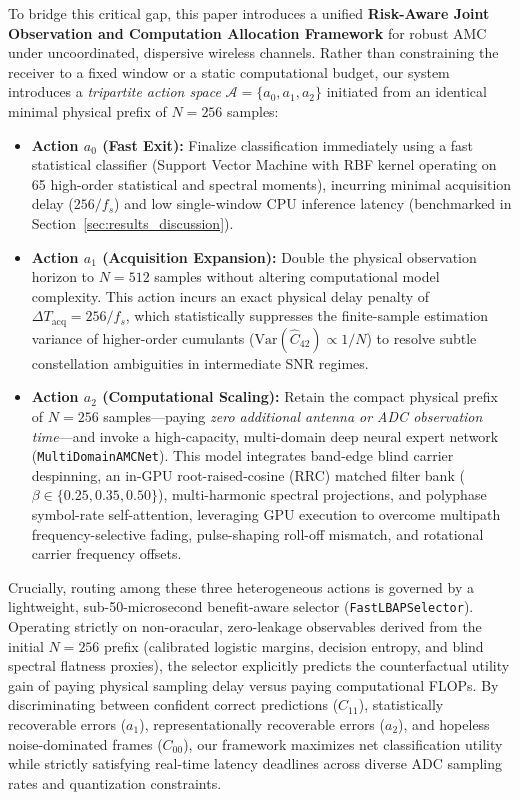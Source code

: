 To bridge this critical gap, this paper introduces a unified \textbf{Risk-Aware Joint Observation and Computation Allocation Framework} for robust AMC under uncoordinated, dispersive wireless channels. Rather than constraining the receiver to a fixed window or a static computational budget, our system introduces a \emph{tripartite action space} $\mathcal{A} = \{a_0, a_1, a_2\}$ initiated from an identical minimal physical prefix of $N=256$ samples:
\begin{itemize}
    \item \textbf{Action $a_0$ (Fast Exit):} Finalize classification immediately using a fast statistical classifier (Support Vector Machine with RBF kernel operating on 65 high-order statistical and spectral moments), incurring minimal acquisition delay ($256/f_s$) and low single-window CPU inference latency (benchmarked in Section~\ref{sec:results_discussion}).
    \item \textbf{Action $a_1$ (Acquisition Expansion):} Double the physical observation horizon to $N=512$ samples without altering computational model complexity. This action incurs an exact physical delay penalty of $\Delta T_{\text{acq}} = 256/f_s$, which statistically suppresses the finite-sample estimation variance of higher-order cumulants ($\mathrm{Var}(\hat{C}_{42}) \propto 1/N$) to resolve subtle constellation ambiguities in intermediate SNR regimes.
    \item \textbf{Action $a_2$ (Computational Scaling):} Retain the compact physical prefix of $N=256$ samples—paying \emph{zero additional antenna or ADC observation time}—and invoke a high-capacity, multi-domain deep neural expert network (\texttt{MultiDomainAMCNet}). This model integrates band-edge blind carrier despinning, an in-GPU root-raised-cosine (RRC) matched filter bank ($\beta \in \{0.25, 0.35, 0.50\}$), multi-harmonic spectral projections, and polyphase symbol-rate self-attention, leveraging GPU execution to overcome multipath frequency-selective fading, pulse-shaping roll-off mismatch, and rotational carrier frequency offsets.
\end{itemize}

Crucially, routing among these three heterogeneous actions is governed by a lightweight, sub-50-microsecond benefit-aware selector (\texttt{FastLBAPSelector}). Operating strictly on non-oracular, zero-leakage observables derived from the initial $N=256$ prefix (calibrated logistic margins, decision entropy, and blind spectral flatness proxies), the selector explicitly predicts the counterfactual utility gain of paying physical sampling delay versus paying computational FLOPs. By discriminating between confident correct predictions ($C_{11}$), statistically recoverable errors ($a_1$), representationally recoverable errors ($a_2$), and hopeless noise-dominated frames ($C_{00}$), our framework maximizes net classification utility while strictly satisfying real-time latency deadlines across diverse ADC sampling rates and quantization constraints.

